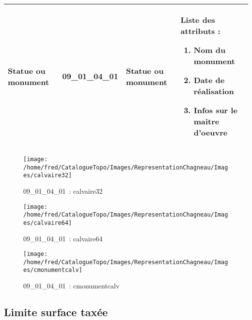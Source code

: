 \documentclass[12pt,titlepage]{book}
\begin{document}
\renewcommand{\arraystretch}{1.2}
\begin{supertabular}{|p{10cm}|c|p{13cm}|p{12cm}|}
 Statue ou monument & 09\_01\_04\_01 & Statue ou monument & Liste des attributs :
\begin{enumerate}
  \item Nom du monument  \item Date de réalisation  \item Infos sur le maitre d'oeuvre\end{enumerate}
\\
\hline
\end{supertabular}
\begin{figure}[h!]
  \hfill         %
  \begin{minipage}[t]{3cm}
    \begin{center}
      \texttt{[image: /home/fred/CatalogueTopo/Images/RepresentationChagneau/Images/calvaire32]}
      \caption[~09\_01\_04\_01]{\small{09\_01\_04\_01~:} \tiny{calvaire32}}\label{calvaire32}
    \end{center}
  \end{minipage}
  \begin{minipage}[t]{3cm}
    \begin{center}
      \texttt{[image: /home/fred/CatalogueTopo/Images/RepresentationChagneau/Images/calvaire64]}
      \caption[~09\_01\_04\_01]{\small{09\_01\_04\_01~:} \tiny{calvaire64}}\label{calvaire64}
    \end{center}
  \end{minipage}
  \begin{minipage}[t]{3cm}
    \begin{center}
      \texttt{[image: /home/fred/CatalogueTopo/Images/RepresentationChagneau/Images/cmonumentcalv]}
      \caption[~09\_01\_04\_01]{\small{09\_01\_04\_01~:} \tiny{cmonumentcalv}}\label{cmonumentcalv}
    \end{center}
  \end{minipage}
\end{figure}


\subsection{Limite surface taxée}
\noindent
\vspace{\baselineskip}
\end{document}
